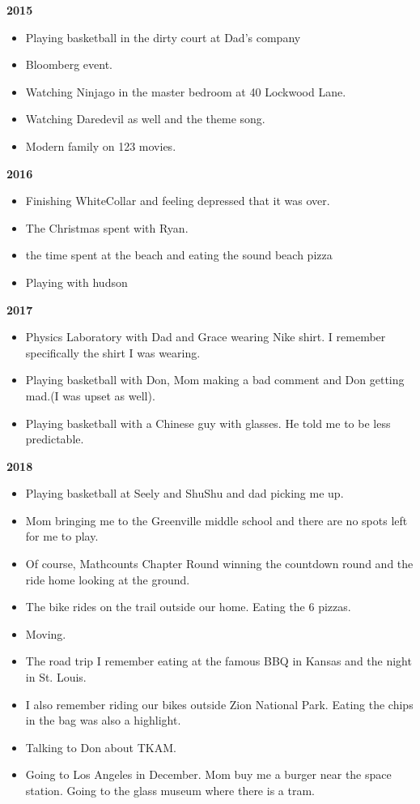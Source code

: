 \documentclass[12pt]{article}
\begin{document}
\textbf{2015}\begin{itemize}
\item Playing basketball in the dirty court at Dad's company \item  Bloomberg event. \item Watching Ninjago in the master bedroom at 40 Lockwood Lane. \item Watching Daredevil as well and the theme song. \item Modern family on 123 movies. \end{itemize}
 \textbf{2016} \begin{itemize}
\item Finishing WhiteCollar and feeling depressed that it was over. \item The Christmas spent with Ryan. \item the time spent at the beach and eating the sound beach pizza \item Playing with hudson \end{itemize}
 \textbf{2017}
\begin{itemize}
\item Physics Laboratory with Dad and Grace wearing Nike shirt. I remember specifically the shirt I was wearing. \item Playing basketball with Don, Mom making a bad comment and Don getting mad.(I was upset as well). \item Playing basketball with a Chinese guy with glasses. He told me to be less predictable. 
\end{itemize}
 \textbf{2018}
\begin{itemize}
\item Playing basketball at Seely and ShuShu and dad picking me up. \item Mom bringing me to the Greenville middle school and there are no spots left for me to play.\item Of course, Mathcounts Chapter Round winning the countdown round and the ride home looking at the ground. 
\item The bike rides on the trail outside our home. Eating the 6 pizzas.
\item Moving. \item The road trip I remember eating at the famous BBQ in Kansas and the night in St. Louis.\item  I also remember riding our bikes outside Zion National Park. Eating the chips in the bag was also a highlight. \item Talking to Don about TKAM. \item Going to Los Angeles in December. Mom buy me a burger near the space station. Going to the glass museum where there is a tram. 
\end{itemize}
\end{document}
